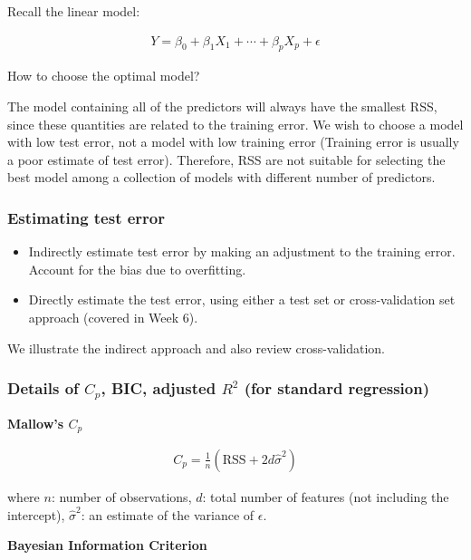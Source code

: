 \indent 

Recall the linear model:

\begin{align*}
    Y = \beta_0 +\beta_1X_1 +\cdots+\beta_pX_p +\epsilon
\end{align*}

\noindent How to choose the optimal model?

The model containing all of the predictors will always have the smallest RSS, since these quantities are related to the training error. We wish to choose a model with low test error, not a model with low training error (Training error is usually a poor estimate of test error). Therefore, RSS are not suitable for selecting the best model among a collection of models with different number of predictors.

\subsubsection{Estimating test error}

\indent 

\begin{itemize}
    \item Indirectly estimate test error by making an adjustment to the training error. Account for the bias due to overfitting.
    \item Directly estimate the test error, using either a test set or cross-validation set approach (covered in Week 6).
\end{itemize}

We illustrate the indirect approach and also review cross-validation.

\subsubsection{Details of $C_p$, BIC, adjusted $R^2$ (for standard regression)}

\indent

\noindent\textbf{Mallow’s $C_p$}

\begin{align*}
    C_p = \frac{1}{n}(\text{RSS}+2d\widehat{\sigma}^2)
\end{align*}

where $n$: number of observations, $d$: total number of features (not including the intercept), $\widehat{\sigma}^2$: an estimate of the variance of $\epsilon$.

\bigskip

\noindent\textbf{Bayesian Information Criterion}

